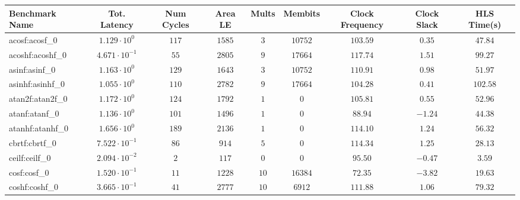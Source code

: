 \begin{tabular}{|l|c|c|c|c|c|c|c|c|}
\hline
Benchmark Name               & Tot. Latency            & Num Cycles & Area LE   & Mults   & Membits    & Clock Frequency & Clock Slack & HLS Time(s) \\
\hline
acosf:acosf\_0               & $ 1.129 \cdot 10^{0}  $ & $ 117    $ & $ 1585  $ & $ 3   $ & $ 10752  $ & $ 103.59      $ & $ 0.35    $ & $ 47.84   $ \\
acoshf:acoshf\_0             & $ 4.671 \cdot 10^{-1} $ & $ 55     $ & $ 2805  $ & $ 9   $ & $ 17664  $ & $ 117.74      $ & $ 1.51    $ & $ 99.27   $ \\
asinf:asinf\_0               & $ 1.163 \cdot 10^{0}  $ & $ 129    $ & $ 1643  $ & $ 3   $ & $ 10752  $ & $ 110.91      $ & $ 0.98    $ & $ 51.97   $ \\
asinhf:asinhf\_0             & $ 1.055 \cdot 10^{0}  $ & $ 110    $ & $ 2782  $ & $ 9   $ & $ 17664  $ & $ 104.28      $ & $ 0.41    $ & $ 102.58  $ \\
atan2f:atan2f\_0             & $ 1.172 \cdot 10^{0}  $ & $ 124    $ & $ 1792  $ & $ 1   $ & $ 0      $ & $ 105.81      $ & $ 0.55    $ & $ 52.96   $ \\
atanf:atanf\_0               & $ 1.136 \cdot 10^{0}  $ & $ 101    $ & $ 1496  $ & $ 1   $ & $ 0      $ & $ 88.94       $ & $ -1.24   $ & $ 44.38   $ \\
atanhf:atanhf\_0             & $ 1.656 \cdot 10^{0}  $ & $ 189    $ & $ 2136  $ & $ 1   $ & $ 0      $ & $ 114.10      $ & $ 1.24    $ & $ 56.32   $ \\
cbrtf:cbrtf\_0               & $ 7.522 \cdot 10^{-1} $ & $ 86     $ & $ 914   $ & $ 5   $ & $ 0      $ & $ 114.34      $ & $ 1.25    $ & $ 28.13   $ \\
ceilf:ceilf\_0               & $ 2.094 \cdot 10^{-2} $ & $ 2      $ & $ 117   $ & $ 0   $ & $ 0      $ & $ 95.50       $ & $ -0.47   $ & $ 3.59    $ \\
cosf:cosf\_0                 & $ 1.520 \cdot 10^{-1} $ & $ 11     $ & $ 1228  $ & $ 10  $ & $ 16384  $ & $ 72.35       $ & $ -3.82   $ & $ 19.63   $ \\
coshf:coshf\_0               & $ 3.665 \cdot 10^{-1} $ & $ 41     $ & $ 2777  $ & $ 10  $ & $ 6912   $ & $ 111.88      $ & $ 1.06    $ & $ 79.32   $ \\

\end{tabular}
